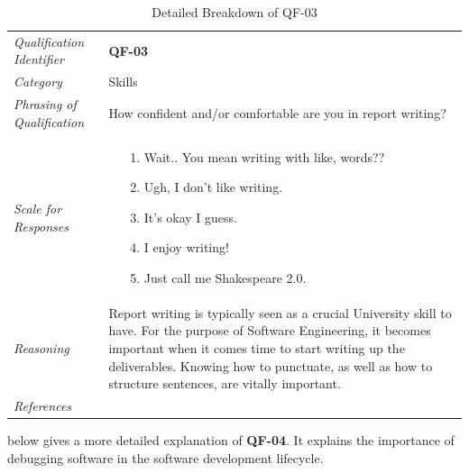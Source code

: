 \documentclass[12pt,letterpaper]{article}
\begin{document}
\begin{table}[H]
	\caption{Detailed Breakdown of QF-03}
	\begin{tabu} to 
		\toprule
		Qualification Identifier & {\bf QF-03}\\
		Category & Skills \\
		Phrasing of Qualification & How confident and/or comfortable are you in report writing? \\
		Scale for Responses &
		\begin{minipage}[t]{\linewidth}
			\begin{enumerate}
				\item[1.] Wait.. You mean writing with like, words?? 
				\item[2.] Ugh, I don't like writing.
				\item[3.] It's okay I guess.
				\item[4.] I enjoy writing!
				\item[5.] Just call me Shakespeare 2.0.
			\end{enumerate}
		\end{minipage}\\
		Reasoning & Report writing is typically seen as a crucial University skill to have. For the purpose of Software Engineering, it becomes important when it comes time to start writing up the deliverables. Knowing how to punctuate, as well as how to structure sentences, are vitally important.\\
		References & \\
		\toprule
	\end{tabu}
\end{table}

 below gives a more detailed explanation of {\bf QF-04}. It explains the importance of debugging software in the software development lifecycle.
\end{document}

